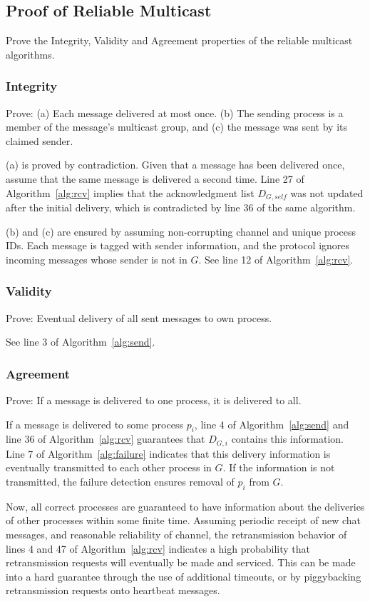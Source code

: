 \documentclass[conference]{IEEEtran}
\begin{document}
\subsection{Proof of Reliable Multicast}
Prove the Integrity, Validity and Agreement properties of the reliable multicast algorithms.

\subsubsection{Integrity}
Prove: (a) Each message delivered at most once. (b) The sending process is a member of the message's multicast group, and (c) the message was sent by its claimed sender.

(a) is proved by contradiction. Given that a message has been delivered once, assume that the same message is delivered a second time. Line 27 of Algorithm~\ref{alg:rcv} implies that the acknowledgment list $D_{G,self}$ was not updated after the initial delivery, which is contradicted by line 36 of the same algorithm.

(b) and (c) are ensured by assuming non-corrupting channel and unique process IDs. Each message is tagged with sender information, and the protocol ignores incoming messages whose sender is not in $G$. See line 12 of Algorithm~\ref{alg:rcv}.

\subsubsection{Validity}
Prove: Eventual delivery of all sent messages to own process.

See line 3 of Algorithm~\ref{alg:send}.

\subsubsection{Agreement}
Prove: If a message is delivered to one process, it is delivered to all.

If a message is delivered to some process $p_i$, line 4 of Algorithm~\ref{alg:send} and line 36 of Algorithm~\ref{alg:rcv} guarantees that $D_{G,i}$ contains this information. Line 7 of Algorithm~\ref{alg:failure} indicates that this delivery information is eventually transmitted to each other process in $G$. If the information is not transmitted, the failure detection ensures removal of $p_i$ from $G$.

Now, all correct processes are guaranteed to have information about the deliveries of other processes within some finite time. Assuming periodic receipt of new chat messages, and reasonable reliability of channel, the retransmission behavior of lines 4 and 47 of Algorithm~\ref{alg:rcv} indicates a high probability that retransmission requests will eventually be made and serviced. This can be made into a hard guarantee through the use of additional timeouts, or by piggybacking retransmission requests onto heartbeat messages.
\end{document}
